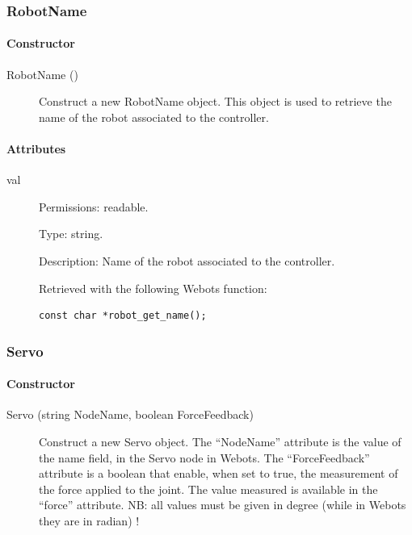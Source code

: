 \subsubsection{RobotName}
\label{webots.uobjects.robotdevices.robotname}%

\paragraph{Constructor}
\label{webots.uobjects.robotdevices.robotname.constructor}%

\noindent
\begin{description}
\item[{RobotName ()}]     Construct a new RobotName object. This object is used to retrieve the name of the
          robot associated to the \urbi controller.

\end{description}

\paragraph{Attributes}
\label{webots.uobjects.robotdevices.robotname.attributes}%

\noindent
\begin{description}
\item[{         val
 }]            Permissions: readable.


 Type: string.


 Description: Name of the robot associated to the \urbi controller.


 Retrieved with the following Webots function:


\begin{lstlisting}
const char *robot_get_name();
\end{lstlisting}
\end{description}

\subsubsection{Servo}
\label{webots.uobjects.robotdevices.servo}%

\paragraph{Constructor}
\label{webots.uobjects.robotdevices.servo.constructor}%

\noindent
\begin{description}
\item[{Servo (string NodeName, boolean ForceFeedback)}] Construct a new Servo object. The ``NodeName'' attribute is the value
          of the name field, in the Servo node in Webots. The ``ForceFeedback'' attribute
          is a boolean that enable, when set to true, the measurement of the force applied
          to the joint. The value measured is available in the ``force'' attribute.
          NB: all values must be given in degree (while in Webots they are in radian) !

\end{description}

